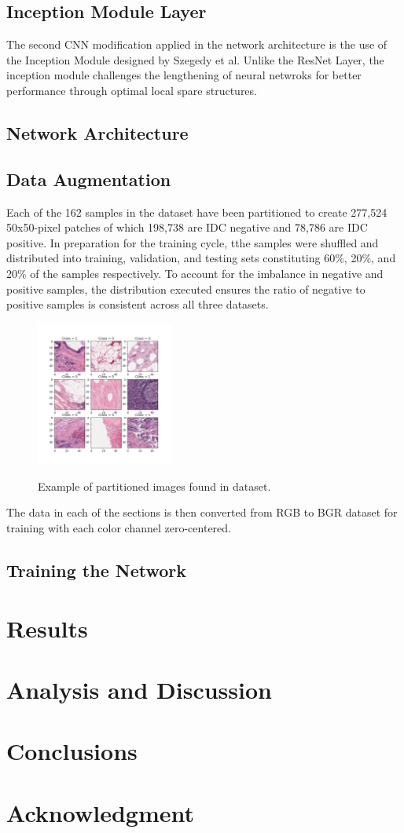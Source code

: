 \documentclass[conference]{IEEEtran}
\begin{document}
\subsection{Inception Module Layer}
The second CNN modification applied in the network architecture is the use of the Inception Module \cite{Szegedy2014} designed by Szegedy et al. Unlike the ResNet Layer, the inception module challenges the lengthening of neural netwroks for better performance through optimal local spare structures.

\subsection{Network Architecture}
\subsection{Data Augmentation}
Each of the 162 samples in the dataset have been partitioned to create 277,524 50x50-pixel patches of which 198,738 are IDC negative and 78,786 are IDC positive. In preparation for the training cycle, tthe samples were shuffled and distributed into training, validation, and testing sets constituting 60\%, 20\%, and 20\% of the samples respectively. To account for the imbalance in negative and positive samples, the distribution executed ensures the ratio of negative to positive samples is consistent across all three datasets.

\begin{figure}
\centering
\includegraphics[width=0.4\textwidth]{figures/dataset_example.png}
\label{dataset_example}
\caption{Example of partitioned images found in dataset.}
\end{figure}

The data in each of the sections is then converted from RGB to BGR dataset for training with each color channel zero-centered. 

\subsection{Training the Network}

\section{Results}

\section{Analysis and Discussion}

\section{Conclusions}

\section*{Acknowledgment}


\end{document}
